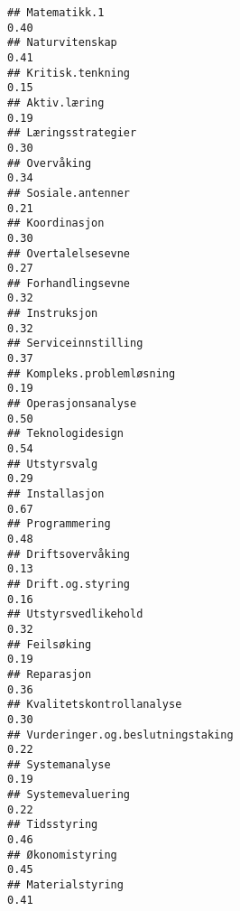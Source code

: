 \documentclass[
]{article}
\begin{document}
\begin{verbatim}
## Matematikk.1                                                                     0.40
## Naturvitenskap                                                                   0.41
## Kritisk.tenkning                                                                 0.15
## Aktiv.læring                                                                     0.19
## Læringsstrategier                                                                0.30
## Overvåking                                                                       0.34
## Sosiale.antenner                                                                 0.21
## Koordinasjon                                                                     0.30
## Overtalelsesevne                                                                 0.27
## Forhandlingsevne                                                                 0.32
## Instruksjon                                                                      0.32
## Serviceinnstilling                                                               0.37
## Kompleks.problemløsning                                                          0.19
## Operasjonsanalyse                                                                0.50
## Teknologidesign                                                                  0.54
## Utstyrsvalg                                                                      0.29
## Installasjon                                                                     0.67
## Programmering                                                                    0.48
## Driftsovervåking                                                                 0.13
## Drift.og.styring                                                                 0.16
## Utstyrsvedlikehold                                                               0.32
## Feilsøking                                                                       0.19
## Reparasjon                                                                       0.36
## Kvalitetskontrollanalyse                                                         0.30
## Vurderinger.og.beslutningstaking                                                 0.22
## Systemanalyse                                                                    0.19
## Systemevaluering                                                                 0.22
## Tidsstyring                                                                      0.46
## Økonomistyring                                                                   0.45
## Materialstyring                                                                  0.41

\end{verbatim}
\end{document}
